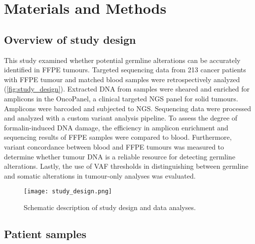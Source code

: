 
\chapter{Materials and Methods}
\label{ch:Materialsandmethods}

\section{Overview of study design}
\label{sec:Overviewofstudydesign}

This study examined whether potential germline alterations can be accurately identified in FFPE tumours. Targeted sequencing data from 213 cancer patients with FFPE tumour and matched blood samples were retrospectively analyzed (\autoref{fig:study_design}). Extracted DNA from samples were sheared and enriched for amplicons in the OncoPanel, a clinical targeted NGS panel for solid tumours. Amplicons were barcoded and subjected to NGS. Sequencing data were processed and analyzed with a custom variant analysis pipeline. To assess the degree of formalin-induced DNA damage, the efficiency in amplicon enrichment and sequencing results of FFPE samples were compared to blood. Furthermore, variant concordance between blood and FFPE tumours was measured to determine whether tumour DNA is a reliable resource for detecting germline alterations. Lastly, the use of VAF thresholds in distinguishing between germline and somatic alterations in tumour-only analyses was evaluated.


\begin{figure}[H]
	\centering
	\texttt{[image: study\_design.png]}
	\caption{Schematic description of study design and data analyses.}
	\label{fig:study_design}
\end{figure}


\section{Patient samples}
\label{sec:Patientsamples}

